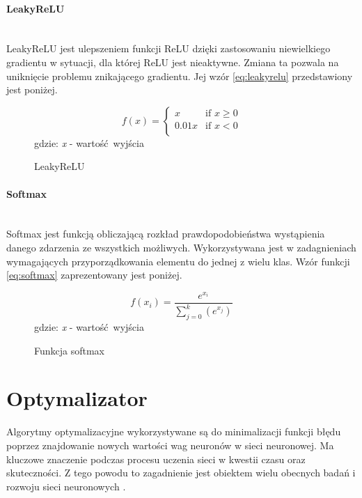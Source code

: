 \paragraph{LeakyReLU} \mbox{}\\
LeakyReLU jest ulepszeniem funkcji ReLU \cite{CS231n_activ} dzięki zastosowaniu niewielkiego
gradientu w sytuacji, dla której ReLU jest nieaktywne. Zmiana ta pozwala na uniknięcie
problemu znikającego gradientu. Jej wzór \ref{eq:leakyrelu} przedstawiony jest poniżej.
\begin{figure}[h!]
\renewcommand{\figurename}{Wzór}%
\begin{equation} \label{eq:leakyrelu}
f(x) =
\begin{cases}
x & \text{if } x \geqslant 0 \\
0.01x & \text{if } x < 0 \\
\end{cases}
\end{equation}
\centering
gdzie: \textit{x} - wartość wyjścia
\caption{LeakyReLU}
\end{figure}

\paragraph{Softmax} \mbox{}\\
Softmax jest funkcją obliczającą rozkład prawdopodobieństwa wystąpienia danego zdarzenia
ze wszystkich możliwych. Wykorzystywana jest w zadagnieniach wymagających przyporządkowania
elementu do jednej z wielu klas. Wzór funkcji \ref{eq:softmax} zaprezentowany jest poniżej.
\begin{figure}[h!]
\renewcommand{\figurename}{Wzór}%
\begin{equation} \label{eq:softmax}
f(x_{i}) = \frac{e^{x_{i}}} {\sum_{j = 0}^{k}(e^{x_{j}})}
\end{equation}
\centering
gdzie: \textit{x} - wartość wyjścia
\caption{Funkcja softmax}
\end{figure}

\section{Optymalizator}

Algorytmy optymalizacyjne wykorzystywane są do minimalizacji funkcji błędu poprzez
znajdowanie nowych wartości wag neuronów w sieci neuronowej. Ma kluczowe
znaczenie podczas procesu uczenia sieci w kwestii czasu oraz skuteczności.
Z tego powodu to zagadnienie jest obiektem wielu obecnych badań i rozwoju sieci
neuronowych \cite{typesOfOptimizationAlgorithms}.

